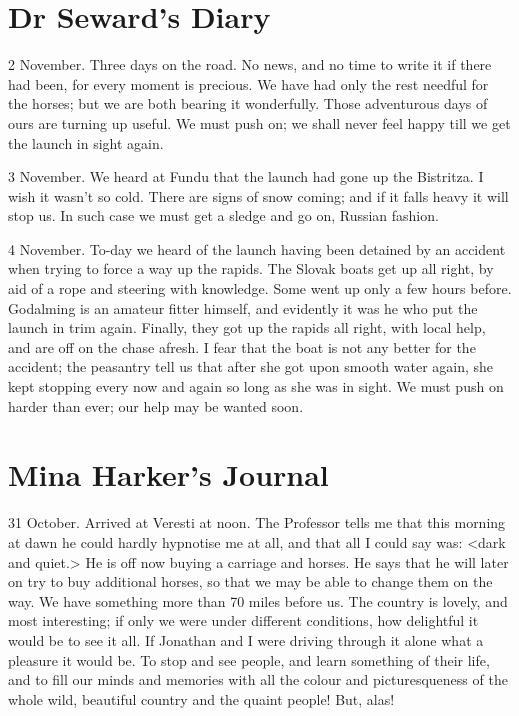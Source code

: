 \section{Dr Seward's Diary}

\begin{diary}{2 November.}
Three days on the road. No news, and no time to write it if there had been, for every moment is precious. We have had only the rest needful for the horses; but we are both bearing it wonderfully. Those adventurous days of ours are turning up useful. We must push on; we shall never feel happy till we get the launch in sight again.
\end{diary}

 

\begin{diary}{3 November.}
We heard at Fundu that the launch had gone up the Bistritza. I wish it wasn't so cold. There are signs of snow coming; and if it falls heavy it will stop us. In such case we must get a sledge and go on, Russian fashion.
\end{diary}

 

\begin{diary}{4 November.}
To-day we heard of the launch having been detained by an accident when trying to force a way up the rapids. The Slovak boats get up all right, by aid of a rope and steering with knowledge. Some went up only a few hours before. Godalming is an amateur fitter himself, and evidently it was he who put the launch in trim again. Finally, they got up the rapids all right, with local help, and are off on the chase afresh. I fear that the boat is not any better for the accident; the peasantry tell us that after she got upon smooth water again, she kept stopping every now and again so long as she was in sight. We must push on harder than ever; our help may be wanted soon.
	\end{diary}


\section{Mina Harker's Journal}

\begin{diary}{31 October.}
Arrived at Veresti at noon. The Professor tells me that this morning at dawn he could hardly hypnotise me at all, and that all I could say was: <dark and quiet.> He is off now buying a carriage and horses. He says that he will later on try to buy additional horses, so that we may be able to change them on the way. We have something more than 70 miles before us. The country is lovely, and most interesting; if only we were under different conditions, how delightful it would be to see it all. If Jonathan and I were driving through it alone what a pleasure it would be. To stop and see people, and learn something of their life, and to fill our minds and memories with all the colour and picturesqueness of the whole wild, beautiful country and the quaint people! But, alas!\longdash
\end{diary}

